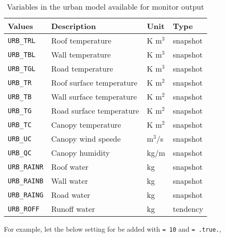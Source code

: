 \begin{table}[h]
\begin{center}
  \caption{Variables in the urban model available for monitor output}
  \label{tab:varlist_monitor_urban}
  \begin{tabularx}{150mm}{|l|X|l|l|} \hline
    \rowcolor[gray]{0.9}  Values & Description & Unit & Type \\ \hline
      \verb|URB_TRL|    & Roof temperature         & K m$^3$ & snapshot \\
      \verb|URB_TBL|    & Wall temperature         & K m$^3$ & snapshot \\
      \verb|URB_TGL|    & Road temperature         & K m$^3$ & snapshot \\
      \verb|URB_TR|     & Roof surface temperature & K m$^2$ & snapshot \\
      \verb|URB_TB|     & Wall surface temperature & K m$^2$ & snapshot \\
      \verb|URB_TG|     & Road surface temperature & K m$^2$ & snapshot \\
      \verb|URB_TC|     & Canopy temperature       & K m$^2$ & snapshot \\
      \verb|URB_UC|     & Canopy wind speede       & m$^3$/s & snapshot \\
      \verb|URB_QC|     & Canopy humidity          & kg/m & snapshot \\
      \verb|URB_RAINR|  & Roof water               & kg   & snapshot \\
      \verb|URB_RAINB|  & Wall water               & kg   & snapshot \\
      \verb|URB_RAING|  & Road water               & kg   & snapshot \\
      \verb|URB_ROFF|   & Runoff water             & kg   & tendency \\
    \hline
  \end{tabularx}
\end{center}
\end{table}


For example, let the below setting for  be added with  \verb|= 10| and  \verb|= .true.|,


